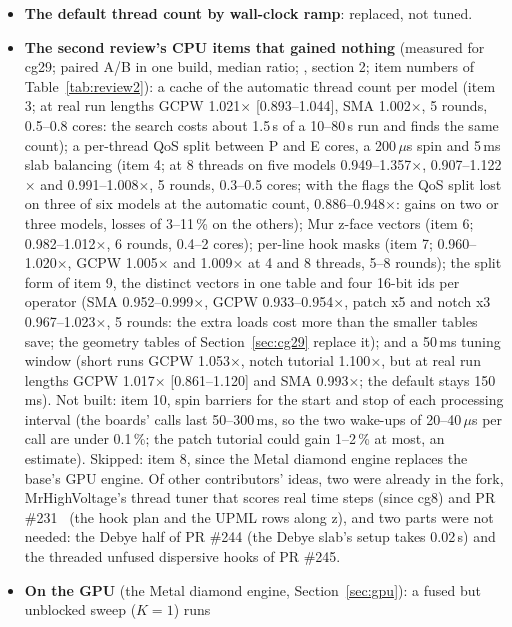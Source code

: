 \begin{itemize}
  diamond engine (Section~\ref{sec:gpu}). The rewrite itself stays a side project.
\item \textbf{The default thread count by wall-clock ramp}: replaced, not tuned.
\item \textbf{The second review's CPU items that gained nothing} (measured for cg29; paired A/B in one build, median
  ratio; , section 2; item numbers of Table~\ref{tab:review2}): a cache
  of the automatic thread count per model (item 3; at real run lengths GCPW 1.021$\times$ [0.893--1.044], SMA
  1.002$\times$, 5 rounds, 0.5--0.8 cores: the search costs about 1.5\,s of a 10--80\,s run and finds the same count);
  a per-thread QoS split between P and E cores, a 200\,$\mu$s spin and 5\,ms slab balancing (item 4; at 8 threads on
  five models 0.949--1.357$\times$, 0.907--1.122$\times$ and 0.991--1.008$\times$, 5 rounds, 0.3--0.5 cores; with the
  flags the QoS split lost on three of six models at the automatic count, 0.886--0.948$\times$: gains on two or three
  models, losses of 3--11\,\% on the others); Mur z-face vectors (item 6; 0.982--1.012$\times$, 6 rounds, 0.4--2
  cores); per-line hook masks (item 7; 0.960--1.020$\times$, GCPW 1.005$\times$ and 1.009$\times$ at 4 and 8 threads,
  5--8 rounds); the split form of item 9, the distinct vectors in one table and four 16-bit ids per operator (SMA
  0.952--0.999$\times$, GCPW 0.933--0.954$\times$, patch x5 and notch x3 0.967--1.023$\times$, 5 rounds: the extra
  loads cost more than the smaller tables save; the geometry tables of Section~\ref{sec:cg29} replace it); and a
  50\,ms tuning window (short runs GCPW 1.053$\times$, notch tutorial 1.100$\times$, but at real run lengths GCPW
  1.017$\times$ [0.861--1.120] and SMA 0.993$\times$; the default stays 150\,ms). Not built: item 10, spin barriers
  for the start and stop of each processing interval (the boards' calls last 50--300\,ms, so the two wake-ups of
  20--40\,$\mu$s per call are under 0.1\,\%; the patch tutorial could gain 1--2\,\% at most, an estimate). Skipped:
  item 8, since the Metal diamond engine replaces the base's GPU engine. Of other contributors' ideas, two were already
  in the fork, MrHighVoltage's thread tuner that scores real time steps (since cg8) and PR \#231~\cite{akdag231} (the
  hook plan and the UPML rows along z), and two parts were not needed: the Debye half of PR \#244 (the Debye slab's
  setup takes 0.02\,s) and the threaded unfused dispersive hooks of PR \#245.
\item \textbf{On the GPU} (the Metal diamond engine, Section~\ref{sec:gpu}): a fused but unblocked sweep ($K=1$) runs

\end{itemize}
